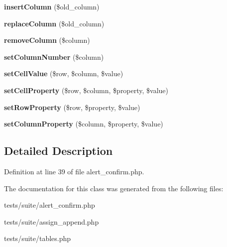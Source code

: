 \begin{DoxyCompactItemize}
\item 
\hypertarget{classclsPage_ab4d81c6b088221ac03a2a3c0b19cd96d}{
{\bfseries insertColumn} (\$old\_\-column)}
\label{classclsPage_ab4d81c6b088221ac03a2a3c0b19cd96d}

\item 
\hypertarget{classclsPage_ac1c6b7aac1cf3003c58c5146631b6fea}{
{\bfseries replaceColumn} (\$old\_\-column)}
\label{classclsPage_ac1c6b7aac1cf3003c58c5146631b6fea}

\item 
\hypertarget{classclsPage_ae6f0cd72648a617ea7ea310cc0bac901}{
{\bfseries removeColumn} (\$column)}
\label{classclsPage_ae6f0cd72648a617ea7ea310cc0bac901}

\item 
\hypertarget{classclsPage_a92f0d2ab81862fadf63cd0840070770b}{
{\bfseries setColumnNumber} (\$column)}
\label{classclsPage_a92f0d2ab81862fadf63cd0840070770b}

\item 
\hypertarget{classclsPage_addef5bd69436a52d31a7dfa540539c41}{
{\bfseries setCellValue} (\$row, \$column, \$value)}
\label{classclsPage_addef5bd69436a52d31a7dfa540539c41}

\item 
\hypertarget{classclsPage_a6abbc411a311d9d72de0755c48ec932f}{
{\bfseries setCellProperty} (\$row, \$column, \$property, \$value)}
\label{classclsPage_a6abbc411a311d9d72de0755c48ec932f}

\item 
\hypertarget{classclsPage_a0b77ab4280a0d4efd5be597d490f6c66}{
{\bfseries setRowProperty} (\$row, \$property, \$value)}
\label{classclsPage_a0b77ab4280a0d4efd5be597d490f6c66}

\item 
\hypertarget{classclsPage_a4fea6ac11ec887303142f367b8176ea0}{
{\bfseries setColumnProperty} (\$column, \$property, \$value)}
\label{classclsPage_a4fea6ac11ec887303142f367b8176ea0}

\end{DoxyCompactItemize}


\subsection{Detailed Description}


Definition at line 39 of file alert\_\-confirm.php.



The documentation for this class was generated from the following files:\begin{DoxyCompactItemize}
\item 
tests/suite/alert\_\-confirm.php\item 
tests/suite/assign\_\-append.php\item 
tests/suite/tables.php\end{DoxyCompactItemize}
